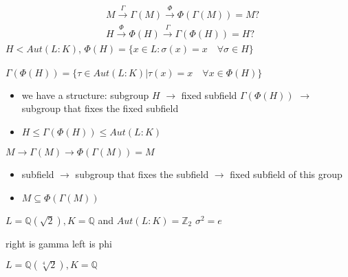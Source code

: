 \documentclass{article}
\begin{document}
\begin{align*}
    &M \xrightarrow{\Gamma} \Gamma(M) \xrightarrow{\Phi} \Phi(\Gamma(M)) = M ?\\ 
    &H \xrightarrow{\Phi} \Phi(H) \xrightarrow{\Gamma} \Gamma(\Phi(H)) = H ?
\end{align*}
$H < Aut(L:K)$, $\Phi(H) = \{x \in L : \sigma(x) = x \quad \forall \sigma \in H\}$  \\ 
\hrulefill \\ 
$\Gamma(\Phi(H)) = \{\tau \in Aut(L:K) | \tau(x) = x \quad \forall x \in \Phi(H)\}$ 
\begin{itemize}
    \item we have a structure: subgroup $H$  $\rightarrow$ fixed subfield $\Gamma(\Phi(H))$ $\rightarrow$ subgroup that fixes the fixed subfield 
    \item $H \leq \Gamma(\Phi(H)) \leq Aut(L:K)$ 
\end{itemize}
$M \to \Gamma(M) \to \Phi(\Gamma(M)) = M$ 
\begin{itemize}
    \item subfield $\to$ subgroup  that fixes the subfield $\to$ fixed subfield of this group
    \item $M \subseteq \Phi(\Gamma(M))$
\end{itemize}

\begin{example}
    $L = \mathbb{Q}(\sqrt{2}), K = \mathbb{Q} $ and $Aut(L:K) = \mathbb{Z}_2$ $\sigma^2 = e$ \\
    right is gamma left is phi
\end{example}
\begin{example}
    $L = \mathbb{Q}(\sqrt[4]{2}), K = \mathbb{Q}$ \\
\end{example}
\end{document}
